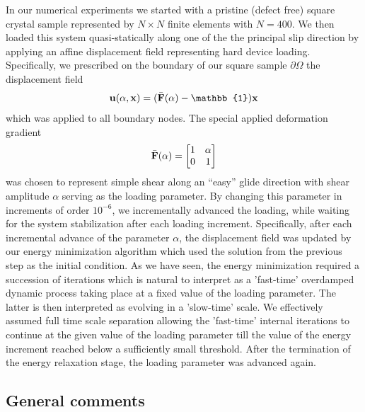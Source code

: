 \documentclass[aps,
superscriptaddress,notitlepage]{revtex4-1}
\begin{document}
In our numerical experiments we   started with a pristine (defect free) square crystal sample represented by $N\times N$ finite elements with $N=400$. We then loaded this system quasi-statically along one of the the principal slip direction by  applying an affine displacement field representing hard device loading.  Specifically,  we prescribed   on the  boundary of our square sample $\partial \Omega$ the   displacement field 
\begin{equation}
 {\bf u}(\alpha,{\bf x})= (\bar{\bf F}(\alpha )-\mathbb{1}){\bf x} 
 \end{equation}
which was applied to all  boundary nodes. The special applied deformation gradient 
 \begin{equation} \label{F}
  \bar{\bf F}(\alpha)=\begin{bmatrix} 1  & \alpha \\ 0 & 1 \end{bmatrix}
  \end{equation}
was chosen to represent  simple shear along an  “easy” glide direction with shear amplitude $\alpha$  serving as the loading parameter.  By changing this parameter in increments of order $10^{-6}$,  we incrementally advanced   the  loading, while  waiting  for the system stabilization after each loading increment.  Specifically, after each incremental advance of the parameter   $\alpha$, the  displacement field was updated  by our  energy minimization algorithm   which used the solution from the previous step as the initial condition.  As we have seen, the energy minimization required a succession of iterations which is natural to interpret as a 'fast-time' overdamped dynamic process  taking place at a fixed value of the loading parameter. The latter is then interpreted as  evolving in a  'slow-time' scale. We effectively assumed full time scale separation allowing the 'fast-time' internal iterations to continue at the given value of the loading parameter  till  the value of  the energy increment reached below a sufficiently small threshold. After the termination of the energy relaxation stage, the loading parameter was  advanced again. 
 
 
 








\subsection{General comments}
\label{sec:length_scale}
\end{document}
